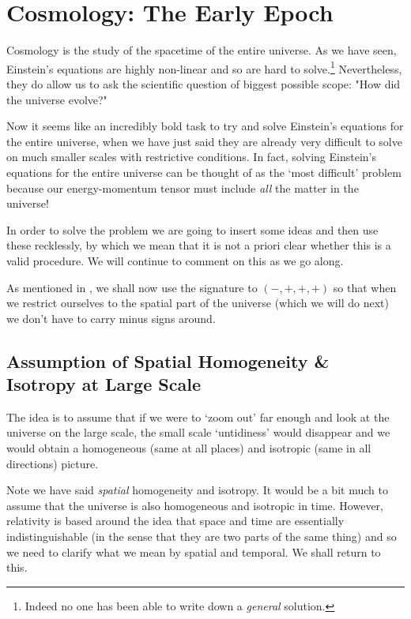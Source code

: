 \chapter{Cosmology: The Early Epoch}

Cosmology is the study of the spacetime of the entire universe. As we have seen, Einstein's equations are highly non-linear and so are hard to solve.\footnote{Indeed no one has been able to write down a \textit{general} solution.} Nevertheless, they do allow us to ask the scientific question of biggest possible scope: "How did the universe evolve?"

Now it seems like an incredibly bold task to try and solve Einstein's equations for the entire universe, when we have just said they are already very difficult to solve on much smaller scales with restrictive conditions. In fact, solving Einstein's equations for the entire universe can be thought of as the `most difficult' problem because our energy-momentum tensor must include \textit{all} the matter in the universe! 

In order to solve the problem we are going to insert some ideas and then use these recklessly, by which we mean that it is not a priori clear whether this is a valid procedure. We will continue to comment on this as we go along. 

\br 
    As mentioned in , we shall now use the signature to $(-,+,+,+)$ so that when we restrict ourselves to the spatial part of the universe (which we will do next) we don't have to carry minus signs around. 
\er

\section{Assumption of Spatial Homogeneity \& Isotropy at Large Scale}

The idea is to assume that if we were to `zoom out' far enough and look at the universe on the large scale, the small scale `untidiness' would disappear and we would obtain a homogeneous (same at all places) and isotropic (same in all directions) picture. 

\br 
    Note we have said \textit{spatial} homogeneity and isotropy. It would be a bit much to assume that the universe is also homogeneous and isotropic in time. However, relativity is based around the idea that space and time are essentially indistinguishable (in the sense that they are two parts of the same thing) and so we need to clarify what we mean by spatial and temporal. We shall return to this. 
\er 

